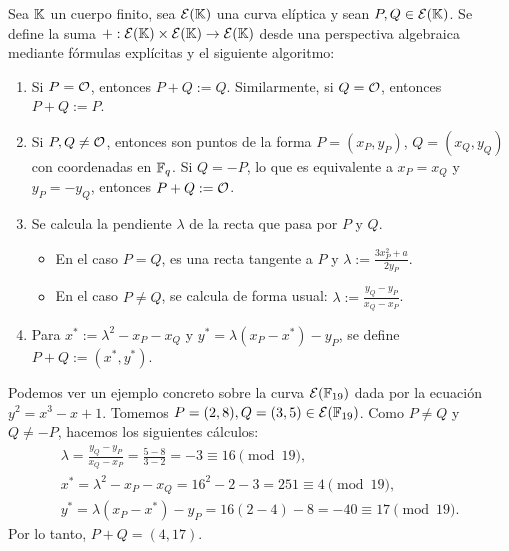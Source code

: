 \begin{definition}
\label{def:apendice-a-curvas-elipticas-definicion-algebraica-de-suma-en-curvas-elipticas}
	Sea $\mathbb{K}$ un cuerpo finito, sea $\mathcal{E}(\mathbb{K})$ una curva elíptica y sean $P, Q \in \mathcal{E}(\mathbb{K})$. Se define la suma $+: \mathcal{E}(\mathbb{K}) \times \mathcal{E}(\mathbb{K}) \to \mathcal{E}(\mathbb{K})$ desde una perspectiva algebraica mediante fórmulas explícitas y el siguiente algoritmo:
	\begin{enumerate}
		\item Si $P = \mathcal{O}$, entonces $P + Q := Q$. Similarmente, si $Q = \mathcal{O}$, entonces $P + Q := P$.
		\item Si $P, Q \neq \mathcal{O}$, entonces son puntos de la forma $P = (x_P, y_P)$, $Q = (x_Q, y_Q)$ con coordenadas en $\mathbb{F}_q$. Si $Q = -P$, lo que es equivalente a $x_P = x_Q$ y $y_P = -y_Q$, entonces $P + Q := \mathcal{O}$.
		\item Se calcula la pendiente $\lambda$ de la recta que pasa por $P$ y $Q$.
		\begin{itemize}
			\item En el caso $P = Q$, es una recta tangente a $P$ y $\lambda := \frac{3x_P^2 + a}{2y_P}$.
			\item En el caso $P \neq Q$, se calcula de forma usual: $\lambda := \frac{y_Q - y_P}{x_Q - x_P}$.
		\end{itemize}
		\item Para $x^* := \lambda^2 - x_P - x_Q$ y $y^* = \lambda(x_P - x^*) - y_P$, se define $P + Q := (x^*, y^*)$.
	\end{enumerate}
\end{definition}

Podemos ver un ejemplo concreto sobre la curva $\mathcal{E}(\mathbb{F}_{19})$ dada por la ecuación $y^2 = x^3 - x + 1$. Tomemos
$P = (2,8), Q = (3,5) \in \mathcal{E}(\mathbb{F}_{19})$. Como $P \neq Q$ y $Q \neq -P$, hacemos los siguientes cálculos:
$$\begin{aligned}
	\lambda = \frac{y_Q - y_P}{x_Q - x_P} = \frac{5 - 8}{3 - 2} = -3 \equiv 16 \pmod{19}, \\
	x^* = \lambda^2 - x_P - x_Q = 16^2 - 2 - 3 = 251 \equiv 4 \pmod{19}, \\
	y^* = \lambda(x_P - x^*) - y_P = 16(2 - 4) - 8 = -40 \equiv 17 \pmod{19}.
\end{aligned}$$
Por lo tanto, $P + Q = (4,17)$.

